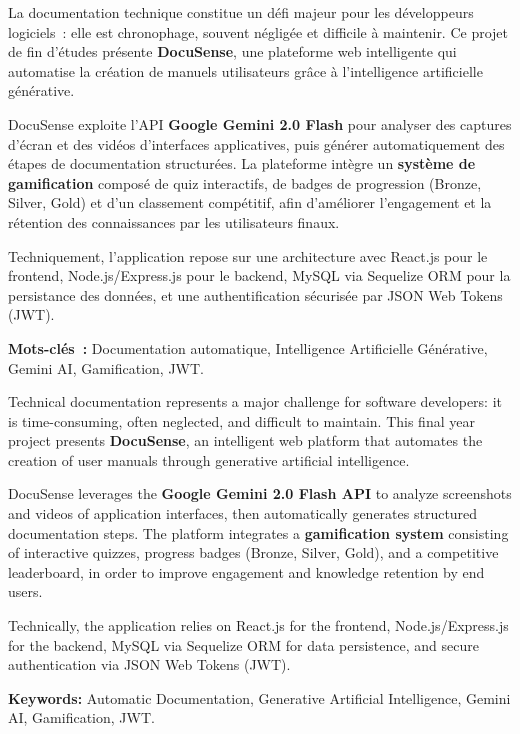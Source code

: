 \documentclass[12pt, a4paper, twoside, openany]{report}
\begin{document}
\begin{tcolorbox}[colback=DSlight, colframe=DSblue,
  title=\textbf{R\'esum\'e -- Fran\c{c}ais}, arc=6pt]
La documentation technique constitue un d\'efi majeur pour les d\'eveloppeurs
logiciels~: elle est chronophage, souvent n\'eglig\'ee et difficile \`a maintenir.
Ce projet de fin d'\'etudes pr\'esente \textbf{DocuSense}, une plateforme web
intelligente qui automatise la cr\'eation de manuels utilisateurs gr\^ace \`a
l'intelligence artificielle g\'en\'erative.

DocuSense exploite l'API \textbf{Google Gemini 2.0 Flash} pour analyser des
captures d'\'ecran et des vid\'eos d'interfaces applicatives, puis g\'en\'erer
automatiquement des \'etapes de documentation structur\'ees. La plateforme
int\`egre un \textbf{syst\`eme de gamification} compos\'e de quiz interactifs,
de badges de progression (Bronze, Silver, Gold) et d'un classement comp\'etitif,
afin d'am\'eliorer l'engagement et la r\'etention des connaissances par les
utilisateurs finaux.

Techniquement, l'application repose sur une architecture avec React.js pour
le frontend, Node.js/Express.js pour le backend, MySQL via Sequelize ORM
pour la persistance des donn\'ees, et une authentification s\'ecuris\'ee par
JSON Web Tokens (JWT).

\textbf{Mots-cl\'es~:} Documentation automatique, Intelligence Artificielle
G\'en\'erative, Gemini AI, Gamification, JWT.
\end{tcolorbox}

\vspace{1cm}

\begin{tcolorbox}[colback=green!5, colframe=DSgreen,
  title=\textbf{Abstract -- English}, arc=6pt]
Technical documentation represents a major challenge for software developers:
it is time-consuming, often neglected, and difficult to maintain.
This final year project presents \textbf{DocuSense}, an intelligent web platform
that automates the creation of user manuals through generative artificial intelligence.

DocuSense leverages the \textbf{Google Gemini 2.0 Flash API} to analyze screenshots
and videos of application interfaces, then automatically generates structured
documentation steps. The platform integrates a \textbf{gamification system}
consisting of interactive quizzes, progress badges (Bronze, Silver, Gold),
and a competitive leaderboard, in order to improve engagement and knowledge
retention by end users.

Technically, the application relies on React.js for the frontend,
Node.js/Express.js for the backend, MySQL via Sequelize ORM for data
persistence, and secure authentication via JSON Web Tokens (JWT).

\textbf{Keywords:} Automatic Documentation, Generative Artificial Intelligence,
Gemini AI, Gamification, JWT.
\end{tcolorbox}
\end{document}
